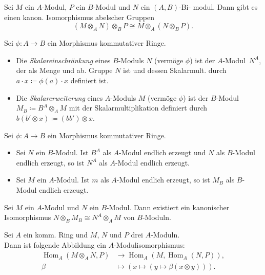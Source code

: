 \documentclass{cheat-sheet}
\DeclareMathOperator{\Hom}{Hom} %
\begin{document}
\begin{lem}
  Sei $M$ ein $A$-Modul, $P$ ein $B$-Modul und $N$ ein $(A, B)$-Bi- modul.
  Dann gibt es einen kanon. Isomorphismus abelscher Gruppen
  \[
    (M \otimes_A N) \otimes_B P \cong M \otimes_A (N \otimes_B P).
  \]
\end{lem}



\begin{defn}
  Sei $\phi : A \to B$ ein Morphismus kommutativer Ringe. \\
  \begin{itemize}
    \item Die \emph{Skalareinschränkung} eines $B$-Moduls $N$ (vermöge $\phi$) ist der $A$-Modul~$N^A$, der als Menge und ab. Gruppe $N$ ist und dessen Skalarmult. durch $a \cdot x \coloneqq \phi(a) \cdot x$ definiert ist.
    \item Die \emph{Skalarerweiterung} eines $A$-Moduls $M$ (vermöge $\phi$) ist der $B$-Modul~$M_B \coloneqq B^A \otimes_A M$ mit der Skalarmultiplikation definiert durch $b (b' \otimes x) \coloneqq (b b') \otimes x$.
  \end{itemize}
\end{defn}

\begin{prop}
  Sei $\phi : A \to B$ ein Morphismus kommutativer Ringe.
  \begin{itemize}
    \item Sei $N$ ein $B$-Modul.
    Ist $B^A$ als $A$-Modul endlich erzeugt und $N$ als $B$-Modul endlich erzeugt, so ist $N^A$ als $A$-Modul endlich erzeugt.
    \item Sei $M$ ein $A$-Modul.
    Ist $m$ als $A$-Modul endlich erzeugt, so ist $M_B$ als $B$-Modul endlich erzeugt.
  \end{itemize}
\end{prop}

\begin{lem}
  Sei $M$ ein $A$-Modul und $N$ ein $B$-Modul.
  Dann existiert ein kanonischer Isomorphismus $N \otimes_B M_B \cong N^A \otimes_A M$ von $B$-Moduln.
\end{lem}



\begin{prop}
  Sei $A$ ein komm. Ring und $M$, $N$ und $P$ drei $A$-Moduln. \\
  Dann ist folgende Abbildung ein $A$-Modulisomorphismus:
  \begin{align*}
    \Hom_A(M \otimes_A N, P) & \to \Hom_A(M, \Hom_A(N, P)), \\
    \beta & \mapsto (x \mapsto (y \mapsto \beta(x \otimes y))).
  \end{align*}
\end{prop}
\end{document}
